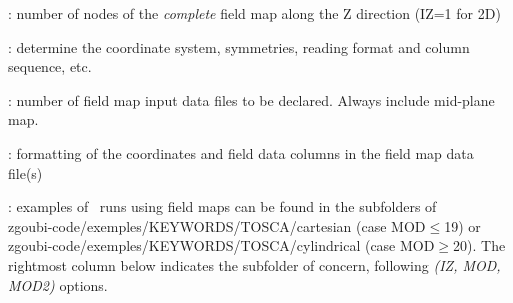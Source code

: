   
 : number of nodes of the \textsl{complete} field map along the Z direction (IZ=1 for 2D)

 : determine the coordinate system,  symmetries, reading format and column sequence,  etc.

 : number of field map input data files to be declared. Always include mid-plane map.

 : formatting of the coordinates and field data columns in the field map data file(s) 

 : examples of \zgoubi\ runs using field maps can be found in the subfolders 
of \\
zgoubi-code/exemples/KEYWORDS/TOSCA/cartesian (case MOD$\leq$19) or \\
 zgoubi-code/exemples/KEYWORDS/TOSCA/cylindrical (case MOD$\geq$20). The rightmost column  below 
indicates the  subfolder of concern, following \textsl{(IZ, MOD, MOD2)} options. 

\centering

\renewcommand{\arraystretch}{1}

